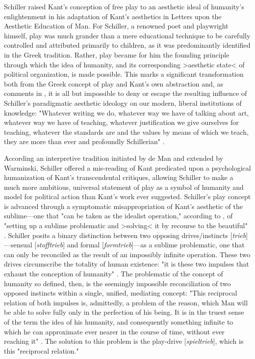 Schiller raised Kant's conception of free play to an aesthetic ideal of humanity's enlightenment in his adaptation of Kant's aesthetics in Letters upon the Aesthetic Education of Man. For Schiller, a renowned poet and playwright himself, play was much grander than a mere educational technique to be carefully controlled and attributed primarily to children, as it was predominantly identified in the Greek tradition. Rather, play became for him the founding principle through which the idea of humanity, and its corresponding >aesthetic state< of political organization, is made possible. This marks a significant transformation both from the Greek concept of play and Kant's own abstraction and, as \citeauthor{DeMan1996-ks} comments in , it is all but impossible to deny or escape the resulting influence of Schiller's paradigmatic aesthetic ideology on our modern, liberal institutions of knowledge: "Whatever writing we do, whatever way we have of talking about art, whatever way we have of teaching, whatever justification we give ourselves for teaching, whatever the standards are and the values by means of which we teach, they are more than ever and profoundly Schillerian" \autocite[142]{DeMan1996-ks}.

According an interpretive tradition initiated by de Man and extended by Warminski, Schiller offered a mis-reading of Kant predicated upon a psychological humanization of Kant's transcendental critiques, allowing Schiller to make a much more ambitious, universal statement of play as a symbol of humanity and model for political action than Kant's work ever suggested. Schiller's play concept is advanced through a symptomatic misappropriation of Kant's aesthetic of the sublime---one that "can be taken as the idealist operation," according to \citeauthor{Warminski2001-kd}, of "setting up a sublime problematic and >solving< it by recourse to the beautiful" \autocite[970]{Warminski2001-kd}. Schiller posits a binary distinction between two opposing drives/instincts [\emph{trieb}]---sensual [\emph{stofftrieb}] and formal [\emph{formtrieb}]---as a sublime problematic, one that can only be reconciled as the result of an impossibly infinite operation. These two drives circumscribe the totality of human existence: "it is these two impulses that exhaust the conception of humanity" \autocite*[67]{Schiller2004-if}. The problematic of the concept of humanity so defined, then, is the seemingly impossible reconciliation of two opposed instincts within a single, unified, mediating concept: "This reciprocal relation of both impulses is, admittedly, a problem of the reason, which Man will be able to solve fully only in the perfection of his being. It is in the truest sense of the term the idea of his humanity, and consequently something infinite to which he can approximate ever nearer in the course of time, without ever reaching it" \autocite[73]{Schiller2004-if}. The solution to this problem is the play-drive [\emph{spieltrieb}], which is this "reciprocal relation."


